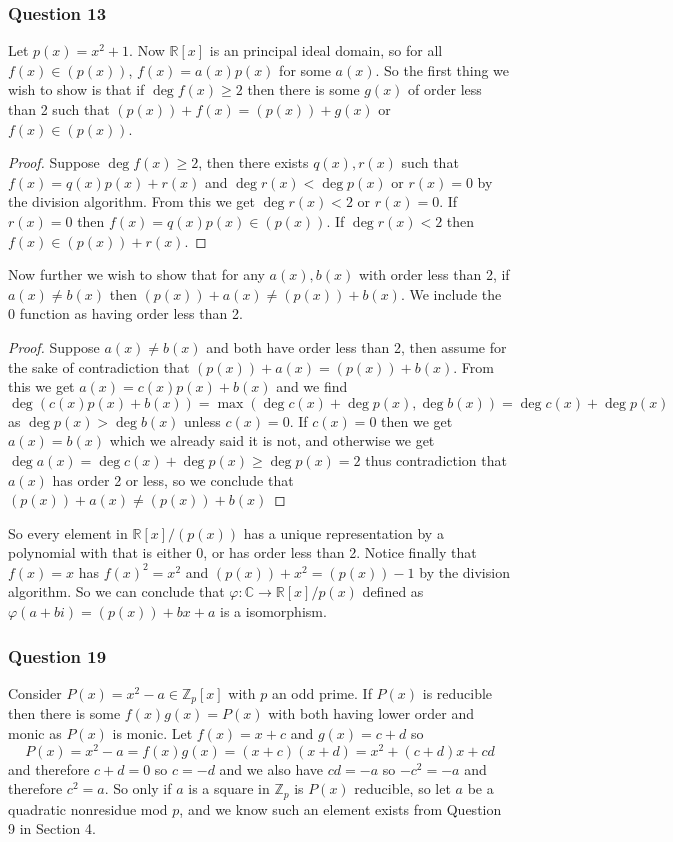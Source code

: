 \documentclass{article}
\begin{document}
\subsubsection{Question 13}
Let $p(x) = x^2 +1$. Now $\mathbb R[x]$ is an principal ideal domain, so for all $f(x) \in (p(x))$, $f(x) = a(x)p(x)$ for some $a(x)$. So the first thing we wish to show is that if $\deg f(x) \ge 2$ then there is some $g(x)$ of order less than 2 such that $(p(x))+f(x) = (p(x)) +g(x)$ or $f(x)\in (p(x))$.

\begin{proof}
	Suppose $\deg f(x) \ge 2$, then there exists $q(x),r(x)$ such that $f(x)=q(x)p(x)+r(x)$ and $\deg r(x) < \deg p(x)$ or $r(x) = 0$ by the division algorithm. From this we get $\deg r(x) < 2$ or $r(x) = 0$. If $r(x)=0$ then $f(x) = q(x)p(x)\in(p(x))$. If $\deg r(x) < 2$ then $f(x) \in (p(x))+r(x)$.
\end{proof}

Now further we wish to show that for any $a(x),b(x)$ with order less than 2, if $a(x)\not=b(x)$ then $(p(x))+a(x)\not=(p(x))+b(x)$. We include the 0 function as having order less than 2.

\begin{proof}
	Suppose $a(x) \not=b(x)$ and both have order less than 2, then assume for the sake of contradiction that $(p(x))+a(x)=(p(x))+b(x)$.  From this we get $a(x)=c(x)p(x)+b(x)$ and we find $\deg(c(x)p(x)+b(x)) = \max(\deg c(x)+\deg p(x), \deg b(x)) = \deg c(x)+\deg p(x)$ as $\deg p(x) > \deg b(x)$ unless $c(x) = 0$. If $c(x) = 0$ then we get $a(x) = b(x)$ which we already said it is not, and otherwise we get $\deg a(x) = \deg c(x) + \deg p(x) \ge \deg p(x) = 2$ thus contradiction that $a(x)$ has order 2 or less, so we conclude that $(p(x))+a(x)\not=(p(x))+b(x)$
\end{proof}

So every element in $\mathbb R[x]/(p(x))$ has a unique representation by a polynomial with that is either 0, or has order less than 2. Notice finally that $f(x) = x$ has $f(x)^2=x^2$ and $(p(x))+x^2 = (p(x))-1$ by the division algorithm. So we can conclude that $\varphi:\mathbb C\to\mathbb R[x]/p(x)$ defined as $\varphi(a+bi)=(p(x)) + bx+a$ is a isomorphism.


\subsubsection{Question 19}

Consider $P(x) = x^2-a \in \mathbb Z_p[x]$ with $p$ an odd prime. If $P(x)$ is reducible then there is some $f(x)g(x) = P(x)$ with both having lower order and monic as $P(x)$ is monic. Let $f(x) = x+c$ and $g(x) = c+d$ so $$P(x)=x^2-a=f(x)g(x)=(x+c)(x+d) = x^2+(c+d)x+cd$$ and therefore $c+d = 0$ so $c=-d$ and we also have $cd=-a$ so $-c^2=-a$ and therefore $c^2=a$. So only if $a$ is a square in $\mathbb Z_p$ is $P(x)$ reducible, so let $a$ be a quadratic nonresidue mod $p$, and we know such an element exists from Question 9 in Section 4.
\end{document}
